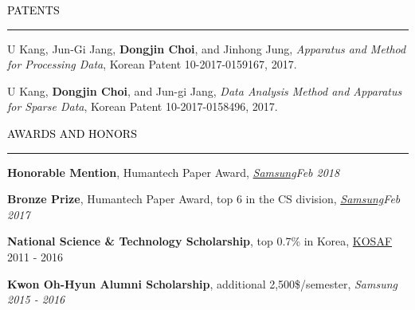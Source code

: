\documentclass{resume} %
\renewenvironment{rSection}[1]{
	\sectionskip
	\textcolor{Black}{\MakeUppercase{#1}}
	\sectionlineskip
	\hrule
	\begin{list}{}{
			\setlength{\leftmargin}{1.5em}
		}
		\item[]
	}{
	\end{list}
}
\begin{document}

\begin{rSection}{Patents}
	\begin{rSubsection}{}{}{}{}
		\item U Kang, Jun-Gi Jang, \textbf{Dongjin Choi}, and Jinhong Jung, \textit{Apparatus and Method for Processing Data}, Korean Patent 10-2017-0159167, 2017.
		\item U Kang, \textbf{Dongjin Choi}, and Jun-gi Jang, \textit{Data Analysis Method and Apparatus for Sparse Data}, Korean Patent 10-2017-0158496, 2017.
	\end{rSubsection}
	
\end{rSection}
\vspace{-3mm}


\begin{rSection}{Awards and Honors}
	\begin{rSubsection}{}{}{}{}
		\item \textbf{Honorable Mention}, Humantech Paper Award, \em{\href{https://humantech.samsung.com/saitext/index.jsp}{Samsung}}\em \hfill Feb 2018
		
		\item \textbf{Bronze Prize}, Humantech Paper Award, top 6 in the CS division, \em{\href{https://humantech.samsung.com/saitext/index.jsp}{Samsung}}\em \hfill Feb 2017
		
		\item \textbf{National Science \& Technology Scholarship}, top 0.7\% in Korea, \href{http://www.kosaf.go.kr/}{KOSAF} \hfill 2011 - 2016
		
		\item \textbf{Kwon Oh-Hyun Alumni Scholarship}, additional 2,500\$/semester, \em Samsung \em \hfill 2015 - 2016
		
	\end{rSubsection}

\end{rSection}
\end{document}
